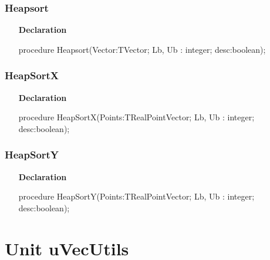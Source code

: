 \documentclass[12pt,a4paper,oneside]{report}
\newcommand{\lmatha}[1]{   %
	\marginpar{\vspace{#1} 
		\begin{flushright}
			LMath 0.5
	\end{flushright} }
}
\newcommand{\declarationitem}[1]{\textbf{#1}}
\begin{document}
\subsubsection{Heapsort}
\label{lmsorting-Heapsort}
\begin{itemize}\item[\declarationitem{Declaration}\hfill]
	\begin{flushleft}
		\begin{ttfamily}
			procedure Heapsort(Vector:TVector; Lb, Ub : integer; desc:boolean);\end{ttfamily}
		
	\end{flushleft}
	
\end{itemize}
\subsubsection{HeapSortX}
\label{lmsorting-HeapSortX}
\begin{itemize}\item[\declarationitem{Declaration}\hfill]
	\begin{flushleft}
		\begin{ttfamily}
			procedure HeapSortX(Points:TRealPointVector; Lb, Ub : integer; desc:boolean);\end{ttfamily}
		
	\end{flushleft}
	
\end{itemize}
\subsubsection{HeapSortY}
\label{lmsorting-HeapSortY}
\begin{itemize}\item[\declarationitem{Declaration}\hfill]
	\begin{flushleft}
		\begin{ttfamily}
			procedure HeapSortY(Points:TRealPointVector; Lb, Ub : integer; desc:boolean);\end{ttfamily}
		
	\end{flushleft}
\end{itemize}
\section{Unit uVecUtils}\label{sec:unit-uvecutils}
\lmatha{-28pt}
\end{document}
